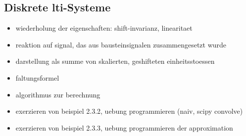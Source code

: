 \subsection{Diskrete \texorpdfstring{\acrshort{lti}}{LTI}-Systeme}\label{disc_lti}

\begin{itemize}
    \item wiederholung der eigenschaften: shift-invarianz, linearitaet
    \item reaktion auf signal, das aus bausteinsignalen zusammengesetzt wurde
    \item darstellung als summe von skalierten, geshifteten einheitsstoessen
    \item faltungsformel
    \item algorithmus zur berechnung
    \item exerzieren von beispiel 2.3.2, uebung programmieren (naiv, scipy convolve)
    \item exerzieren von beispiel 2.3.3, uebung programmieren der approximation
\end{itemize}
